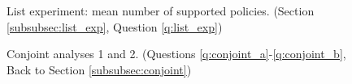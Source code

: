 \begin{figure}[h!]
    \caption[List experiment]{List experiment: mean number of supported policies. (Section \ref{subsubsec:list_exp}, Question \ref{q:list_exp})}\label{fig:list_exp}
\end{figure}

\begin{figure}[h!]
    \caption[Conjoint analyses 1 and 2]{Conjoint analyses 1 and 2. (Questions \ref{q:conjoint_a}-\ref{q:conjoint_b}, Back to Section \ref{subsubsec:conjoint})}\label{fig:conjoint}
\end{figure}



